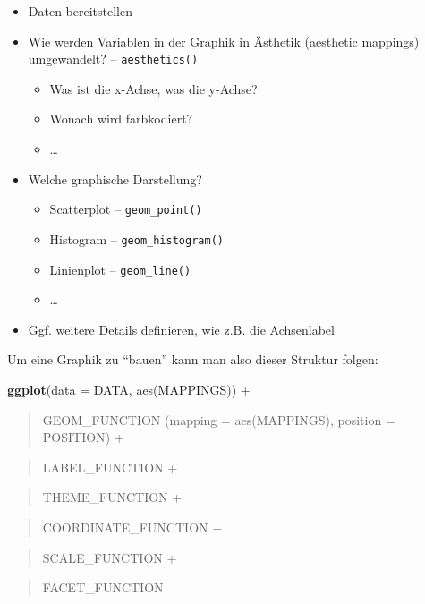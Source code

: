 \documentclass[
  ngerman,
]{book}
\providecommand{\tightlist}{%
  \setlength{\itemsep}{0pt}\setlength{\parskip}{0pt}}
\begin{document}
\begin{itemize}
\item
  {Daten} bereitstellen
\item
  Wie werden Variablen in der Graphik in {Ästhetik (aesthetic mappings) umgewandelt}? -- \texttt{aesthetics()}

  \begin{itemize}
  \tightlist
  \item
    Was ist die x-Achse, was die y-Achse?
  \item
    Wonach wird farbkodiert?
  \item
    \ldots{}
  \end{itemize}
\item
  Welche {graphische Darstellung}?

  \begin{itemize}
  \tightlist
  \item
    Scatterplot -- \texttt{geom\_point()}
  \item
    Histogram -- \texttt{geom\_histogram()}
  \item
    Linienplot -- \texttt{geom\_line()}
  \item
    \ldots{}
  \end{itemize}
\item
  Ggf. weitere {Details} definieren, wie z.B. die Achsenlabel
\end{itemize}

Um eine Graphik zu ``bauen'' kann man also dieser Struktur folgen:

\textbf{ggplot}(data = {DATA}, aes({MAPPINGS})) +

\begin{quote}
{GEOM\_FUNCTION} (mapping = aes({MAPPINGS}), position = {POSITION}) +
\end{quote}

\begin{quote}
{LABEL\_FUNCTION} +
\end{quote}

\begin{quote}
{THEME\_FUNCTION} +
\end{quote}

\begin{quote}
{COORDINATE\_FUNCTION} +
\end{quote}

\begin{quote}
{SCALE\_FUNCTION} +
\end{quote}

\begin{quote}
{FACET\_FUNCTION}
\end{quote}
\end{document}
